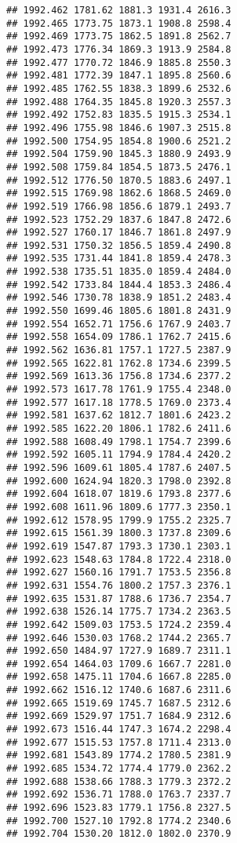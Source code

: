 \documentclass[
]{article}
\begin{document}
\begin{verbatim}
## 1992.462 1781.62 1881.3 1931.4 2616.3
## 1992.465 1773.75 1873.1 1908.8 2598.4
## 1992.469 1773.75 1862.5 1891.8 2562.7
## 1992.473 1776.34 1869.3 1913.9 2584.8
## 1992.477 1770.72 1846.9 1885.8 2550.3
## 1992.481 1772.39 1847.1 1895.8 2560.6
## 1992.485 1762.55 1838.3 1899.6 2532.6
## 1992.488 1764.35 1845.8 1920.3 2557.3
## 1992.492 1752.83 1835.5 1915.3 2534.1
## 1992.496 1755.98 1846.6 1907.3 2515.8
## 1992.500 1754.95 1854.8 1900.6 2521.2
## 1992.504 1759.90 1845.3 1880.9 2493.9
## 1992.508 1759.84 1854.5 1873.5 2476.1
## 1992.512 1776.50 1870.5 1883.6 2497.1
## 1992.515 1769.98 1862.6 1868.5 2469.0
## 1992.519 1766.98 1856.6 1879.1 2493.7
## 1992.523 1752.29 1837.6 1847.8 2472.6
## 1992.527 1760.17 1846.7 1861.8 2497.9
## 1992.531 1750.32 1856.5 1859.4 2490.8
## 1992.535 1731.44 1841.8 1859.4 2478.3
## 1992.538 1735.51 1835.0 1859.4 2484.0
## 1992.542 1733.84 1844.4 1853.3 2486.4
## 1992.546 1730.78 1838.9 1851.2 2483.4
## 1992.550 1699.46 1805.6 1801.8 2431.9
## 1992.554 1652.71 1756.6 1767.9 2403.7
## 1992.558 1654.09 1786.1 1762.7 2415.6
## 1992.562 1636.81 1757.1 1727.5 2387.9
## 1992.565 1622.81 1762.8 1734.6 2399.5
## 1992.569 1613.36 1756.8 1734.6 2377.2
## 1992.573 1617.78 1761.9 1755.4 2348.0
## 1992.577 1617.18 1778.5 1769.0 2373.4
## 1992.581 1637.62 1812.7 1801.6 2423.2
## 1992.585 1622.20 1806.1 1782.6 2411.6
## 1992.588 1608.49 1798.1 1754.7 2399.6
## 1992.592 1605.11 1794.9 1784.4 2420.2
## 1992.596 1609.61 1805.4 1787.6 2407.5
## 1992.600 1624.94 1820.3 1798.0 2392.8
## 1992.604 1618.07 1819.6 1793.8 2377.6
## 1992.608 1611.96 1809.6 1777.3 2350.1
## 1992.612 1578.95 1799.9 1755.2 2325.7
## 1992.615 1561.39 1800.3 1737.8 2309.6
## 1992.619 1547.87 1793.3 1730.1 2303.1
## 1992.623 1548.63 1784.8 1722.4 2318.0
## 1992.627 1560.16 1791.7 1753.5 2356.8
## 1992.631 1554.76 1800.2 1757.3 2376.1
## 1992.635 1531.87 1788.6 1736.7 2354.7
## 1992.638 1526.14 1775.7 1734.2 2363.5
## 1992.642 1509.03 1753.5 1724.2 2359.4
## 1992.646 1530.03 1768.2 1744.2 2365.7
## 1992.650 1484.97 1727.9 1689.7 2311.1
## 1992.654 1464.03 1709.6 1667.7 2281.0
## 1992.658 1475.11 1704.6 1667.8 2285.0
## 1992.662 1516.12 1740.6 1687.6 2311.6
## 1992.665 1519.69 1745.7 1687.5 2312.6
## 1992.669 1529.97 1751.7 1684.9 2312.6
## 1992.673 1516.44 1747.3 1674.2 2298.4
## 1992.677 1515.53 1757.8 1711.4 2313.0
## 1992.681 1543.89 1774.2 1780.5 2381.9
## 1992.685 1534.72 1774.4 1779.0 2362.2
## 1992.688 1538.66 1788.3 1779.3 2372.2
## 1992.692 1536.71 1788.0 1763.7 2337.7
## 1992.696 1523.83 1779.1 1756.8 2327.5
## 1992.700 1527.10 1792.8 1774.2 2340.6
## 1992.704 1530.20 1812.0 1802.0 2370.9

\end{verbatim}
\end{document}

